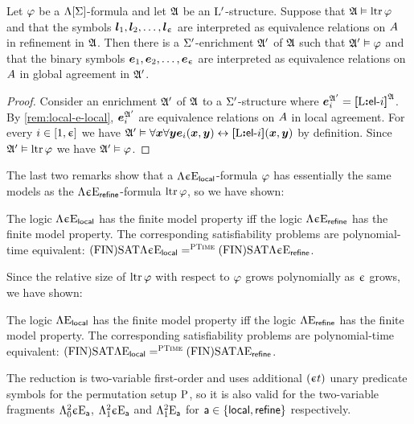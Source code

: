 \begin{remark}
Let $\varphi$ be a $\Lambda[\mathrm{\Sigma}]$-formula and let $\mathfrak{A}$ be an ${\mathrm{L}'}$-structure.
Suppose that $\mathfrak{A} \vDash \operatorname{ltr}\varphi$ and that the symbols
$\bm{l}_{1}, \bm{l}_{2}, \dots, \bm{l}_{\upepsilon}$ are interpreted as equivalence relations on
$A$ in refinement in $\mathfrak{A}$.
Then there is a $\mathrm{\Sigma'}$-enrichment $\mathfrak{A'}$ of $\mathfrak{A}$ such that
$\mathfrak{A'} \vDash \varphi$ and that the binary symbols
$\bm{e}_{1}, \bm{e}_{2}, \dots, \bm{e}_{\upepsilon}$
are interpreted as equivalence relations on $A$ in global agreement in
$\mathfrak{A'}$.
\end{remark}
\begin{proof}
Consider an enrichment $\mathfrak{A'}$ of $\mathfrak{A}$ to a $\mathrm{\Sigma'}$-structure where
$\bm{e}_{i}^{\mathfrak{A'}} = {\bm{[}\mathrm{L}\mathord{\bm{:}}\mathsf{el}{\hbox{-}}i\bm{]}}^{\mathfrak{A}}$.
By \cref{rem:local-e-local}, $\bm{e}_{i}^{\mathfrak{A'}}$ are equivalence
relations on $A$ in local agreement. 
For every $i \in [1,\upepsilon]$ we have
$\mathfrak{A'} \vDash \forall\bm{x} \forall\bm{y} \bm{e}_{i}(\bm{x},\bm{y}) \leftrightarrow {\bm{[}\mathrm{L}\mathord{\bm{:}}\mathsf{el}{\hbox{-}}i\bm{]}}(\bm{x},\bm{y})$
by definition.
Since $\mathfrak{A'} \vDash \operatorname{ltr}\varphi$ we have $\mathfrak{A'} \vDash \varphi$.
\end{proof}

The last two remarks show that a $\Lambda{\upepsilon}\mathrm{E}_{\mathsf{local}}$-formula $\varphi$
has essentially the same models as the $\Lambda{\upepsilon}\mathrm{E}_{\mathsf{refine}}$-formula
$\operatorname{ltr}\varphi$, so we have shown:
\begin{proposition}\label{prop:local-to-refine-n}
The logic $\Lambda{\upepsilon}\mathrm{E}_{\mathsf{local}}$ has the finite model property iff
the logic $\Lambda{\upepsilon}\mathrm{E}_{\mathsf{refine}}$ has the finite model property.
The corresponding satisfiability problems are polynomial-time equivalent:
$\mathrm{(FIN)SAT}\Lambda{\upepsilon}\mathrm{E}_{\mathsf{local}} =^{\text{\normalfont{\scshape PTime}}} \mathrm{(FIN)SAT}\Lambda{\upepsilon}\mathrm{E}_{\mathsf{refine}}$.
\end{proposition}

Since the relative size of $\operatorname{ltr}\varphi$ with respect to $\varphi$ grows
polynomially as $\upepsilon$ grows, we have shown:
\begin{proposition}\label{prop:local-to-refine}
The logic $\Lambda{{}}\mathrm{E}_{\mathsf{local}}$ has the finite model property iff
the logic $\Lambda{{}}\mathrm{E}_{\mathsf{refine}}$ has the finite model property.
The corresponding satisfiability problems are polynomial-time equivalent:
$\mathrm{(FIN)SAT}\Lambda{{}}\mathrm{E}_{\mathsf{local}} =^{\text{\normalfont{\scshape PTime}}} \mathrm{(FIN)SAT}\Lambda{{}}\mathrm{E}_{\mathsf{refine}}$.
\end{proposition}

The reduction is two-variable first-order and uses additional $(\upepsilon t)$
unary predicate symbols for the permutation setup $\mathrm{P}$, so it is also valid
for the two-variable fragments $\Lambda^{2}_{0}{\upepsilon}\mathrm{E}_{\mathsf{a}}$, $\Lambda^{2}_{1}{\upepsilon}\mathrm{E}_{\mathsf{a}}$
and $\Lambda^{2}_{1}{{}}\mathrm{E}_{\mathsf{a}}$ for $\mathsf{a} \in \left\{\mathsf{local}, \mathsf{refine}\right\}$
respectively.